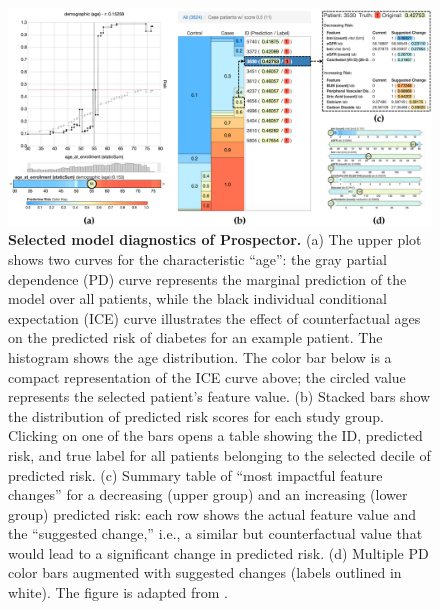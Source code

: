 \documentclass[
  oneside]{book}
\begin{document}
\begin{figure}[htb]

{\centering \includegraphics[width=1\linewidth]{figures/03-prospector} 

}

\caption{\textbf{Selected model diagnostics of Prospector.} (a) The upper plot shows two curves for the characteristic ``age'': the gray partial dependence (PD) curve represents the marginal prediction of the model over all patients, while the black individual conditional expectation (ICE) curve illustrates the effect of counterfactual ages on the predicted risk of diabetes for an example patient. The histogram shows the age distribution. The color bar below is a compact representation of the ICE curve above; the circled value represents the selected patient's feature value. (b) Stacked bars show the distribution of predicted risk scores for each study group. Clicking on one of the bars opens a table showing the ID, predicted risk, and true label for all patients belonging to the selected decile of predicted risk. (c) Summary table of ``most impactful feature changes'' for a decreasing (upper group) and an increasing (lower group) predicted risk: each row shows the actual feature value and the ``suggested change,'' i.e., a similar but counterfactual value that would lead to a significant change in predicted risk. (d) Multiple PD color bars augmented with suggested changes (labels outlined in white). The figure is adapted from \autocite{Krause:Prospector2016}.}\label{fig:03-prospector}
\end{figure}
\end{document}
